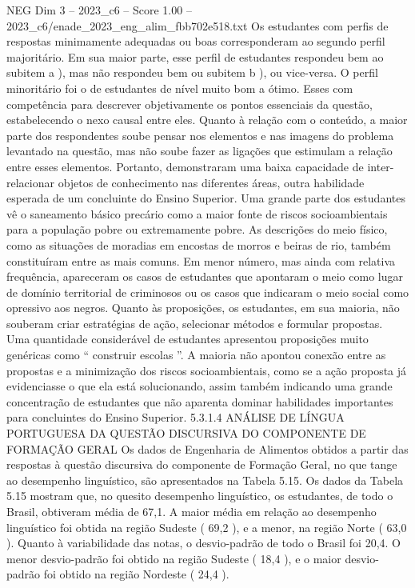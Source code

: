 \begin{textsample}{NEG Dim 3 – 2023\_c6 – Score 1.00 – 2023\_c6/enade\_2023\_eng\_alim\_fbb702e518.txt}
Os estudantes com perfis de respostas minimamente adequadas ou boas corresponderam ao segundo perfil majoritário.
Em sua maior parte, esse perfil de estudantes respondeu bem ao subitem a ), mas não respondeu bem ou subitem b ), ou vice-versa.
O perfil minoritário foi o de estudantes de nível muito bom a ótimo.
Esses com competência para descrever objetivamente os pontos essenciais da questão, estabelecendo o nexo causal entre eles.
Quanto à relação com o conteúdo, a maior parte dos respondentes soube pensar nos elementos e nas imagens do problema levantado na questão, mas não soube fazer as ligações que estimulam a relação entre esses elementos.
Portanto, demonstraram uma baixa capacidade de inter-relacionar objetos de conhecimento nas diferentes áreas, outra habilidade esperada de um concluinte do Ensino Superior.
Uma grande parte dos estudantes vê o saneamento básico precário como a maior fonte de riscos socioambientais para a população pobre ou extremamente pobre.
As descrições do meio físico, como as situações de moradias em encostas de morros e beiras de rio, também constituíram entre as mais comuns.
Em menor número, mas ainda com relativa frequência, apareceram os casos de estudantes que apontaram o meio como lugar de domínio territorial de criminosos ou os casos que indicaram o meio social como opressivo aos negros.
Quanto às proposições, os estudantes, em sua maioria, não souberam criar estratégias de ação, selecionar métodos e formular propostas.
Uma quantidade considerável de estudantes apresentou proposições muito genéricas como “ construir escolas ”.
A maioria não apontou conexão entre as propostas e a minimização dos riscos socioambientais, como se a ação proposta já evidenciasse o que ela está solucionando, assim também indicando uma grande concentração de estudantes que não aparenta dominar habilidades importantes para concluintes do Ensino Superior. 5.3.1.4 ANÁLISE DE LÍNGUA PORTUGUESA DA QUESTÃO DISCURSIVA DO COMPONENTE DE FORMAÇÃO GERAL Os dados de Engenharia de Alimentos obtidos a partir das respostas à questão discursiva do componente de Formação Geral, no que tange ao desempenho linguístico, são apresentados na Tabela 5.15.
Os dados da Tabela 5.15 mostram que, no quesito desempenho linguístico, os estudantes, de todo o Brasil, obtiveram média de 67,1.
A maior média em relação ao desempenho linguístico foi obtida na região Sudeste ( 69,2 ), e a menor, na região Norte ( 63,0 ).
Quanto à variabilidade das notas, o desvio-padrão de todo o Brasil foi 20,4.
O menor desvio-padrão foi obtido na região Sudeste ( 18,4 ), e o maior desvio-padrão foi obtido na região Nordeste ( 24,4 ).

\end{textsample}
